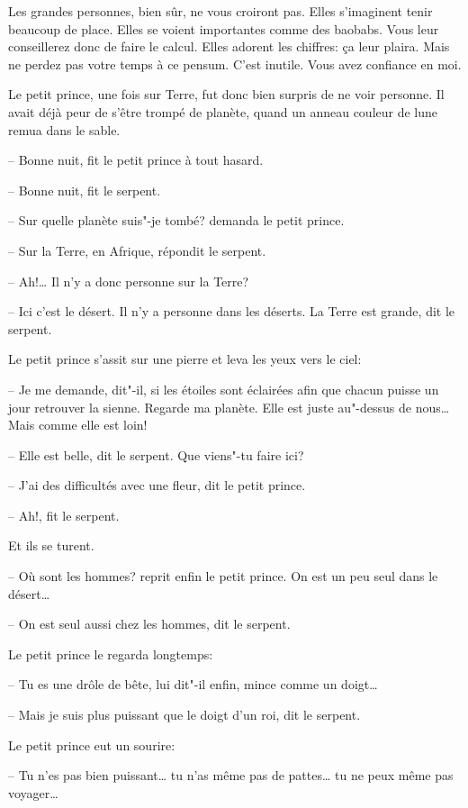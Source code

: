 \begin{Parallel}[p]{}{}
{Les grandes personnes, bien sûr, ne vous croiront
pas. Elles s'imaginent tenir beaucoup de place. Elles
se voient importantes comme des baobabs. Vous
leur conseillerez donc de faire le calcul. Elles adorent les chiffres: ça leur plaira. Mais ne perdez pas
votre temps à ce pensum. C'est inutile. Vous avez
confiance en moi.

Le petit prince, une fois sur Terre, fut donc bien
surpris de ne voir personne. Il avait déjà peur de
s'être trompé de planète, quand un anneau couleur
de lune remua dans le sable.

-- Bonne nuit, fit le petit prince à tout hasard.

-- Bonne nuit, fit le serpent.

-- Sur quelle planète suis"-je tombé? demanda le petit prince.

-- Sur la Terre, en Afrique, répondit le serpent.

-- Ah!\ldots{} Il n'y a donc personne sur la Terre?

-- Ici c'est le désert. Il n'y a personne dans les
déserts. La Terre est grande, dit le serpent.

Le petit prince s'assit sur une pierre et leva les yeux vers le ciel:

-- Je me demande, dit"-il, si les étoiles sont éclairées
afin que chacun puisse un jour retrouver la sienne. Regarde ma planète. Elle est juste au"-dessus de
nous\ldots{} Mais comme elle est loin!

-- Elle est belle, dit le serpent. Que viens"-tu faire ici?

-- J'ai des difficultés avec une fleur, dit le petit prince.

-- Ah!, fit le serpent.

Et ils se turent.

-- Où sont les hommes? reprit enfin le petit prince. On est un peu seul dans le désert\ldots{}

-- On est seul aussi chez les hommes, dit le serpent.

Le petit prince le regarda longtemps:

-- Tu es une drôle de bête, lui dit"-il enfin, mince
comme un doigt\ldots{}

-- Mais je suis plus puissant que le doigt d'un roi, dit le serpent.

Le petit prince eut un sourire:

-- Tu n'es pas bien puissant\ldots{} tu n'as même pas de
pattes\ldots{} tu ne peux même pas voyager\ldots{}

}
\end{Parallel}
